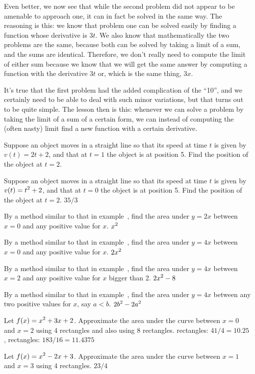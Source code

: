 Even better, we now see that while the second problem did not appear
to be amenable to approach one, it can in fact be solved in the same
way. The reasoning is this: we know that problem one can be solved
easily by finding a function whose derivative is $3t$. We also know
that mathematically the two problems are the same, because both can be
solved by taking a limit of a sum, and the sums are
identical. Therefore, we don't really need to compute the limit of
either sum because we know that we will get the same answer by
computing a function with the derivative $3t$ or, which is the same
thing, $3x$.

It's true that the first problem had the added complication of the
``10'', and we certainly need to be able to deal with such minor
variations, but that turns out to be quite simple. The lesson then is
this: whenever we can solve a problem by taking the limit of a sum of
a certain form, we can instead of computing the (often nasty) limit
find a new function with a certain derivative.

\exercises

\exercise Suppose an object moves in a straight line so that its speed at
time $t$ is given by $v(t)=2t+2$, and that at $t=1$ the object is at
position 5. Find the position of the object at $t=2$.
\endanswer
\endexercise

\exercise Suppose an object moves in a straight line so that its speed at
time $t$ is given by $\displaystyle v(t)=t^2+2$, and that at $t=0$ the object is at
position 5. Find the position of the object at $t=2$.
\answer $35/3$
\endanswer
\endexercise

\exercise By a method similar to that in example~, find the area under $y=2x$ between $x=0$ and any
  positive value for $x$.
\answer $\displaystyle x^2$
\endanswer
\endexercise

\exercise By a method similar to that in example~, find the area under $y=4x$ between $x=0$ and any
  positive value for $x$.
\answer $\displaystyle 2x^2$
\endanswer
\endexercise

\exercise By a method similar to that in example~, find the area under $y=4x$ between $x=2$ and any
  positive value for $x$ bigger than 2.
\answer $\displaystyle 2x^2-8$
\endanswer
\endexercise

\exercise By a method similar to that in example~, find the area under $y=4x$ between any two positive
  values for $x$, say $a<b$.
\answer $\displaystyle 2b^2-2a^2$
\endanswer
\endexercise

\exercise Let $\displaystyle f(x)=x^2+3x+2$. Approximate the area under the curve
between $x=0$ and $x=2$ using 4 rectangles and also using 8
rectangles. 
 rectangles: $41/4=10.25$,\hfill{} rectangles: $183/16= 11.4375$
\endanswer
\endexercise

\exercise Let $\displaystyle f(x)=x^2-2x+3$. Approximate the area under the curve
between $x=1$ and $x=3$ using 4 rectangles. 
\answer $ 23/4$
\endanswer
\endexercise

\endexercises



